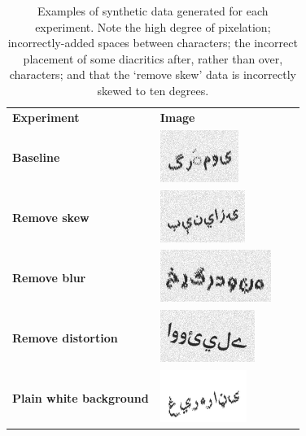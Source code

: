 \documentclass[twocolumn,11pt]{extarticle}
\begin{document}
\begin{table}[H]
\begin{tabular}{|l|l|ll}
\cline{1-2}
\textbf{Experiment}             & \textbf{Image} &  &  \\ \cline{1-2}
\textbf{Baseline}               & \includegraphics[]{images/2_baseline.png}              &  &  \\ \cline{1-2}
\textbf{Remove skew}            & \includegraphics[]{images/2_rs.png}               &  &  \\ \cline{1-2}
\textbf{Remove blur}            & \includegraphics[]{images/3_rb.png}               &  &  \\ \cline{1-2}
\textbf{Remove distortion}      & \includegraphics[]{images/1_rd.png}               &  &  \\ \cline{1-2}
\textbf{Plain white background} & \includegraphics[]{images/0_pw.png}               &  &  \\ \cline{1-2}
\end{tabular}
\caption{Examples of synthetic data generated for each experiment. Note the high degree of pixelation; incorrectly-added spaces between characters;  the incorrect placement of some diacritics after, rather than over, characters; and that the `remove skew' data is incorrectly skewed to ten degrees.}
\label{table:synthetic_examples}
\end{table}
\end{document}
